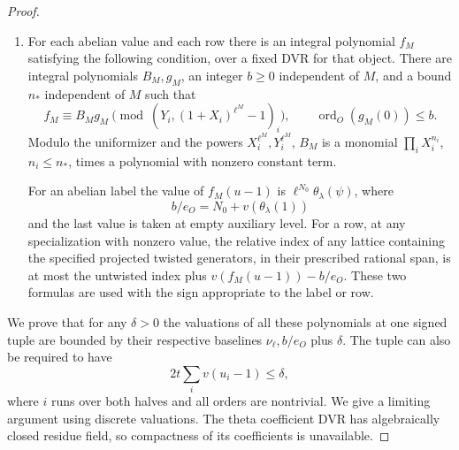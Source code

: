 \begin{proof}
\begin{enumerate}
Let \(A(u)\) be the specialized matrix, \(O_u\) the
valuation ring at this specialization and \(K_u\) its fraction
field. Write \(a\) for the size of this square presentation. Its Smith entries
\(c_j\) give the kernel on \((K_u/O_u)^a\), one summand at a time:
\[
 \ker(c_j:K_u/O_u\to K_u/O_u)=
 \begin{cases}
    c_j^{-1}O_u/O_u,&c_j\ne0,\\
    K_u/O_u,&c_j=0 .
 \end{cases}
\]
The normalized length of the first summand is \(v(c_j)\).
Hence, with \(v(0)=+\infty\), specialization yields
\begin{equation}\label{eq:selmer-twist-smith-specialization}
 \operatorname{len}_{\rm norm}\ker A(u)
       =\sum_j v(c_j)=v(\det A(u))=v(F_{s,M}(u-1)).
\end{equation}
For the opposite side, evaluate \eqref{eq:selmer-twist-smith-specialization} at \(u^{-1}\).
\item For each abelian value and each row there is an integral
polynomial \(f_M\) satisfying the following condition, over a
fixed DVR for that object. There are integral polynomials
\(B_M,g_M\), an integer \(b\ge0\) independent of \(M\), and a
bound \(n_*\) independent of \(M\) such that
\[
 f_M\equiv B_M g_M\pmod{(Y_i,(1+X_i)^{\ell^M}-1)_i},
 \qquad \operatorname{ord}_O(g_M(0))\le b.
\]
Modulo the uniformizer and the powers \(X_i^{\ell^M},Y_i^{\ell^M}\),
\(B_M\) is a monomial \(\prod_i X_i^{n_i}\), \(n_i\le n_*\),
times a polynomial with nonzero constant term.

For an abelian
label the value of \(f_M(u-1)\) is \(\ell^{N_0}\theta_\lambda(\psi)\),
where
\[
 b/e_O=N_0+v(\theta_\lambda(1))
\]
and the last value
is taken at empty auxiliary level. For a row, at any specialization
with nonzero value, the relative index of any lattice containing
the specified projected twisted generators, in their prescribed
rational span, is at most the untwisted index plus
\(v(f_M(u-1))-b/e_O\). These two formulas are used
with the sign appropriate to the label or row.
\end{enumerate}

We prove that for any \(\delta>0\) the valuations of all these
polynomials at one signed tuple are bounded by their respective
baselines \(\nu_\ell,b/e_O\) plus \(\delta\). The tuple can
also be required to have
\[
 2t\sum_i v(u_i-1)\le\delta,
\]
where \(i\) runs over both
halves and all orders are nontrivial. We give a limiting argument using discrete valuations.
The theta coefficient DVR has algebraically closed residue field,
so compactness of its coefficients is unavailable.


\end{proof}
